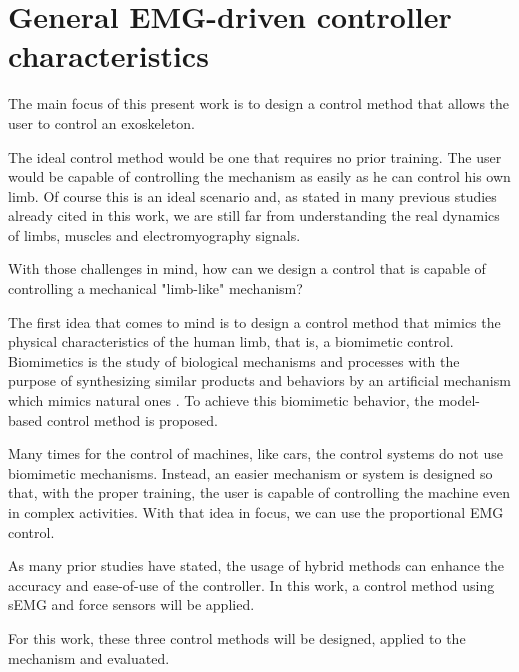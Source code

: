 \chapter{General EMG-driven controller characteristics}

The main focus of this present work is to design a control method that allows the user to control an exoskeleton. 

The ideal control method would be one that requires no prior training. The user would be capable of controlling the mechanism as easily as he can control his own limb. Of course this is an ideal scenario and, as stated in many previous studies already cited in this work, we are still far from understanding the real dynamics of limbs, muscles and electromyography signals.

With those challenges in mind, how can we design a control that is capable of controlling a mechanical "limb-like" mechanism?

The first idea that comes to mind is to design a control method that mimics the physical characteristics of the human limb, that is, a biomimetic control. Biomimetics is the study of biological mechanisms and processes with the purpose of synthesizing similar products and behaviors by an artificial mechanism which mimics natural ones \cite{merriamWebster}. To achieve this biomimetic behavior, the model-based control method is proposed.

Many times for the control of machines, like cars, the control systems do not use biomimetic mechanisms. Instead, an easier mechanism or system is designed so that, with the proper training, the user is capable of controlling the machine even in complex activities. With that idea in focus, we can use the proportional EMG control.

As many prior studies have stated, the usage of hybrid methods can enhance the accuracy and ease-of-use of the controller. In this work, a control method using sEMG and force sensors will be applied.

For this work, these three control methods will be designed, applied to the mechanism and evaluated.












